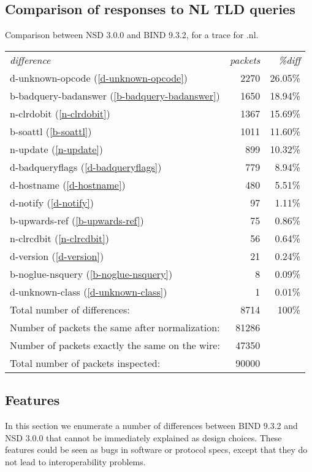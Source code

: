\documentclass[twoside,titlepage,english]{nlnetlabs}
\begin{document}
\subsection{Comparison of responses to NL TLD queries}
\label{nl_b932nsd3}

Comparison between NSD 3.0.0 and BIND 9.3.2, for a trace for .nl.

\begin{tabular}{lrr}
{\em difference}			& {\em packets} & {\em \%diff}	\\
d-unknown-opcode (\ref{d-unknown-opcode})		& 2270 & 26.05\% \\
b-badquery-badanswer (\ref{b-badquery-badanswer})	& 1650 & 18.94\% \\
n-clrdobit (\ref{n-clrdobit})		&  1367 & 15.69\% \\
b-soattl (\ref{b-soattl})		&  1011 & 11.60\% \\
n-update (\ref{n-update})		&  899  & 10.32\% \\
d-badqueryflags (\ref{d-badqueryflags})	&  779  & 8.94\% \\
d-hostname (\ref{d-hostname})		&  480  & 5.51\% \\
d-notify (\ref{d-notify})		&  97   & 1.11\% \\
b-upwards-ref (\ref{b-upwards-ref})	&  75   & 0.86\% \\
n-clrcdbit (\ref{n-clrcdbit})		&  56   & 0.64\% \\
d-version (\ref{d-version})		&  21   & 0.24\% \\
b-noglue-nsquery (\ref{b-noglue-nsquery})	&  8 & 0.09\% \\
d-unknown-class (\ref{d-unknown-class})	&  1  & 0.01\% \\
Total number of differences: & 8714 & 100\% \\
Number of packets the same after normalization: & 81286 \\
Number of packets exactly the same on the wire: & 47350 \\
Total number of packets inspected: & 90000 \\
\end{tabular}

\subsection{Features}
\label{sec:features}

In this section we enumerate a number of differences between 
BIND 9.3.2 and NSD 3.0.0 that cannot be immediately explained
as design choices. These features could be seen as bugs in software
or protocol specs, except that they do not lead to interoperability 
problems.
\end{document}

